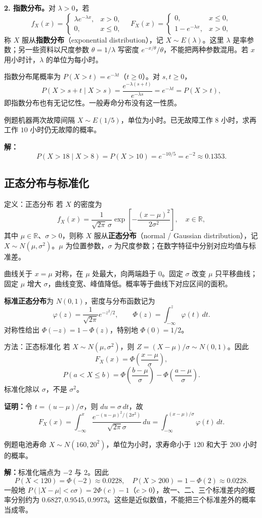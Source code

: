 \documentclass[UTF8,fontset=none,zihao=-4,a4paper]{ctexart}
\newcommand{\term}[1]{\textbf{#1}}
\newcommand{\example}[1]{\begin{infobox}{例题}#1\end{infobox}}
\newcommand{\solution}{\par\noindent\textbf{解：}}
\newcommand{\proof}{\par\noindent\textbf{证明：}}
\begin{document}
\textbf{2. 指数分布。}对 $\lambda>0$，若
\[
f_X(x)=\begin{cases}\lambda e^{-\lambda x},&x>0,\\0,&x\le0,\end{cases}
\quad
F_X(x)=\begin{cases}0,&x\le0,\\1-e^{-\lambda x},&x>0,\end{cases}
\]
称 $X$ 服从\term{指数分布}（exponential distribution），记 $X\sim E(\lambda)$。这里 $\lambda$ 是率参数；另一些资料以尺度参数 $\theta=1/\lambda$ 写密度 $e^{-x/\theta}/\theta$，不能把两种参数混用。若 $x$ 用小时计，$\lambda$ 的单位为每小时。

指数分布尾概率为 $P(X>t)=e^{-\lambda t}$（$t\ge0$）。对 $s,t\ge0$，
\[
P(X>s+t\mid X>s)=\frac{e^{-\lambda(s+t)}}{e^{-\lambda s}}=e^{-\lambda t}=P(X>t),
\]
即指数分布也有无记忆性。一般寿命分布没有这一性质。
\example{机器两次故障间隔 $X\sim E(1/5)$，单位为小时。已无故障工作 $8$ 小时，求再工作 $10$ 小时仍无故障的概率。}
\solution
\[
P(X>18\mid X>8)=P(X>10)=e^{-10/5}=e^{-2}\approx0.1353.
\]
\subsection{正态分布与标准化}
\begin{infobox}{定义：正态分布}
若 $X$ 的密度为
\[
f_X(x)=\frac1{\sqrt{2\pi}\,\sigma}
\exp\left[-\frac{(x-\mu)^2}{2\sigma^2}\right],\quad x\in\mathbb R,
\]
其中 $\mu\in\mathbb R$、$\sigma>0$，则称 $X$ 服从\term{正态分布}（normal / Gaussian distribution），记 $X\sim N(\mu,\sigma^2)$。$\mu$ 为位置参数，$\sigma$ 为尺度参数；在数字特征中分别对应均值与标准差。
\end{infobox}
曲线关于 $x=\mu$ 对称，在 $\mu$ 处最大，向两端趋于 $0$。固定 $\sigma$ 改变 $\mu$ 只平移曲线；固定 $\mu$ 增大 $\sigma$，曲线变宽、峰值降低。概率等于曲线下对应区间的面积。

\term{标准正态分布}为 $N(0,1)$，密度与分布函数记为
\[
\varphi(z)=\frac1{\sqrt{2\pi}}e^{-z^2/2},\qquad
\Phi(z)=\int_{-\infty}^z\varphi(t)\,dt.
\]
对称性给出 $\Phi(-z)=1-\Phi(z)$，特别地 $\Phi(0)=1/2$。
\begin{infobox}{方法：正态标准化}
若 $X\sim N(\mu,\sigma^2)$，则 $Z=(X-\mu)/\sigma\sim N(0,1)$。因此
\[
F_X(x)=\Phi\left(\frac{x-\mu}{\sigma}\right),
\]
\[
P(a<X\le b)=\Phi\left(\frac{b-\mu}{\sigma}\right)
-\Phi\left(\frac{a-\mu}{\sigma}\right).
\]
标准化除以 $\sigma$，不是 $\sigma^2$。
\end{infobox}
\proof 令 $t=(u-\mu)/\sigma$，则 $du=\sigma\,dt$，故
\[
F_X(x)=\int_{-\infty}^x\frac{e^{-(u-\mu)^2/(2\sigma^2)}}{\sqrt{2\pi}\sigma}\,du
=\int_{-\infty}^{(x-\mu)/\sigma}\varphi(t)\,dt.
\]
\example{电池寿命 $X\sim N(160,20^2)$，单位为小时，求寿命小于 $120$ 和大于 $200$ 小时的概率。}
\solution 标准化端点为 $-2$ 与 $2$。因此
\[
P(X<120)=\Phi(-2)\approx0.0228,\quad
P(X>200)=1-\Phi(2)\approx0.0228.
\]
一般地 $P(|X-\mu|<c\sigma)=2\Phi(c)-1$（$c>0$），故一、二、三个标准差内的概率分别约为 $0.6827,0.9545,0.9973$。这些是近似数值，不能把三个标准差外的概率当成零。
\end{document}
